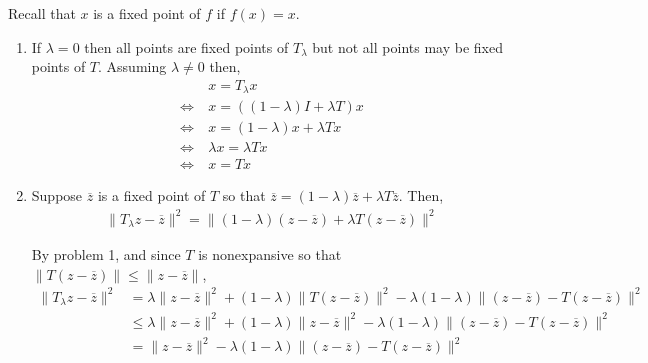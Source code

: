 \documentclass[10pt]{article}
\begin{document}
\begin{solution}[Solution]
    Recall that \( x \) is a fixed point of \( f \) if \( f(x) = x \).
\begin{enumerate}[label=(\alph*)]
    \item 
        If \( \lambda = 0 \) then all points are fixed points of \( T_{\lambda} \) but not all points may be fixed points of \( T \).
        Assuming \( \lambda \neq 0 \) then,
        \begin{align*}
            & x = T_{\lambda} x
            \\\Longleftrightarrow~ & x = ((1-\lambda)I + \lambda T)x
            \\\Longleftrightarrow~ & x = (1-\lambda)x + \lambda Tx
            \\\Longleftrightarrow~ & \lambda x = \lambda Tx
            \\\Longleftrightarrow~ & x = Tx \tag*{\qed}
        \end{align*}
    \item Suppose \( \overline{z} \) is a fixed point of \( T \) so that \( \overline{z} = (1-\lambda) \overline{z} + \lambda T \overline{z} \). Then,
        \begin{align*}
            \| T_{\lambda} z - \overline{z} \|^2
            = \| (1-\lambda)(z-\overline{z}) + \lambda T(z-\overline{z}) \|^2
        \end{align*}

        By problem 1, and since \( T \) is nonexpansive so that \( \|T(z-\overline{z})\| \leq \|z-\overline{z}\| \),
        \begin{align*}
            \| T_{\lambda}z - \overline{z} \|^2 &= \lambda \| z-\overline{z} \|^2 + (1-\lambda) \| T(z-\overline{z}) \|^2 - \lambda(1-\lambda)\|(z-\overline{z}) - T(z-\overline{z})\|^2
            \\& \leq \lambda \| z-\overline{z} \|^2 + (1-\lambda) \| z-\overline{z} \|^2 - \lambda(1-\lambda)\|(z-\overline{z}) - T(z-\overline{z})\|^2
            \\& = \| z-\overline{z} \|^2 - \lambda(1-\lambda)\|(z-\overline{z}) - T(z-\overline{z})\|^2 \tag*{\qed}
        \end{align*}

\end{enumerate}
\end{solution}
\end{document}
